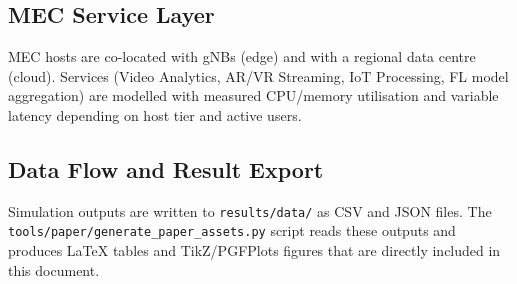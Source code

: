 \subsection{MEC Service Layer}
MEC hosts are co-located with gNBs (edge) and with a regional data centre
(cloud).
Services (Video Analytics, AR/VR Streaming, IoT Processing, FL model
aggregation) are modelled with measured CPU/memory utilisation and
variable latency depending on host tier and active users.

\subsection{Data Flow and Result Export}
Simulation outputs are written to \texttt{results/data/} as CSV and JSON
files.
The \texttt{tools/paper/generate\_paper\_assets.py} script reads these
outputs and produces \LaTeX{} tables and TikZ/PGFPlots figures that are
directly included in this document.
